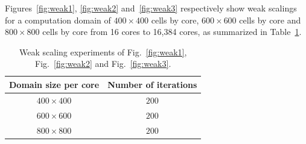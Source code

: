 Figures~\ref{fig:weak1}, \ref{fig:weak2} and~\ref{fig:weak3} respectively show weak scalings for a computation domain of $400 \times 400$ cells by core, $600 \times 600$ cells by core and $800 \times 800$ cells by core from 16 cores to 16,384 cores, as summarized in Table~\ref{tab:weak}.

\begin{table}[!ht]
\begin{center}
 \begin{tabular}{|c|c|}
    Domain size per core & Number of iterations\\
    \hline
     $400 \times 400$ & $200$\\
     $600 \times 600$ & $200$\\
     $800 \times 800$ & $200$\\
 \end{tabular}
 \caption{\label{tab:weak}Weak scaling experiments of Fig.~\ref{fig:weak1}, Fig.~\ref{fig:weak2} and Fig.~\ref{fig:weak3}.}
 \end{center}
\end{table}

